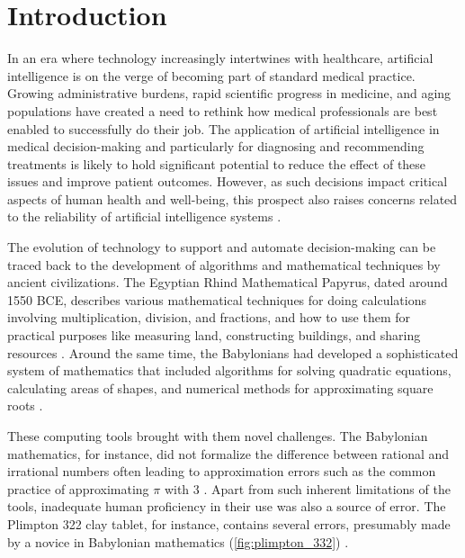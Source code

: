 
\chapter[introduction]{Introduction}\label{chp:introduction}
%
%

In an era where technology increasingly intertwines with healthcare, artificial intelligence is on the verge of becoming part of standard medical practice. 
Growing administrative burdens, rapid scientific progress in medicine, and aging populations have created a need to rethink how medical professionals are best enabled to successfully do their job. 
The application of artificial intelligence in medical decision-making and particularly for diagnosing and recommending treatments is likely to hold significant potential to reduce the effect of these issues and improve patient outcomes. 
However, as such decisions impact critical aspects of human health and well-being, this prospect also raises concerns related to the reliability of artificial intelligence systems \cite{chen_ethical_2021, shailaja_machine_2018, ahmad_interpretable_2018}.

The evolution of technology to support and automate decision-making can be traced back to the development of algorithms and mathematical techniques by ancient civilizations. 
The Egyptian Rhind Mathematical Papyrus, dated around 1550 BCE, describes various mathematical techniques for doing calculations involving multiplication, division, and fractions, and how to use them for practical purposes like measuring land, constructing buildings, and sharing resources \cite{georges_universal_2001}. 
Around the same time, the Babylonians had developed a sophisticated system of mathematics that included algorithms for solving quadratic equations, calculating areas of shapes, and numerical methods for approximating square roots \cite{fowler_square_1998}. 

These computing tools brought with them novel challenges. The Babylonian mathematics, for instance, did not formalize the difference between rational and irrational numbers often leading to approximation errors such as the common practice of approximating $\pi$ with 3 \cite{georges_universal_2001}. Apart from such inherent limitations of the tools, inadequate human proficiency in their use was also a source of error. The Plimpton 322 clay tablet, for instance, contains several errors, presumably made by a novice in Babylonian mathematics (\cref{fig:plimpton_332}) \cite{neugebauer_mathematical_1945,britton_plimpton_2011}. 


